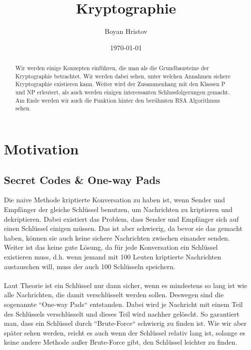 \documentclass[12pt,a4paper]{article}
\author{Boyan Hristov}
\title{Kryptographie}
\date{\today}
\theoremstyle{definition}
\begin{document}
    \maketitle
    \begin{abstract}
        Wir werden einige Konzepten einführen, die man als die Grundbausteine der Kryptographie betrachtet. Wir werden
        dabei sehen, unter welchen Annahmen sichere Kryptographie existieren kann. Weiter wird der Zusammenhang mit den
        Klassen P und NP erleutert, als auch werden einigen interessanten Schlussfolgerungen gemacht. Am Ende werden
        wir auch die Funktion hinter den berühmten RSA Algorithmus sehen.
    \end{abstract}
    \section{Motivation}

    \subsection{Secret Codes \& One-way Pads}
    Die naive Methode kriptierte Konversation zu haben ist, wenn Sender und Empfänger der gleiche Schlüssel benutzen,
    um Nachrichten zu kriptieren und dekriptieren. Dabei existiert das Problem, dass Sender und Empfänger sich auf
    einen Schlüssel einigen müssen. Das ist aber schwierig, da bevor sie das gemacht haben, können sie auch keine
    sichere Nachrichten zwischen einander senden. Weiter ist das keine gute Lösung, da für jede Konversation ein
    Schlüssel existieren muss, d.h. wenn jemand mit 100 Leuten kriptierte Nachrichten austauschen will, muss der auch
    100 Schlüsseln speichern. \\ \\

    Laut Theorie ist ein Schlüssel nur dann sicher, wenn es mindestens so lang ist wie alle Nachrichten, die damit
    verschlüsselt werden sollen. Deswegen sind die sogenannte ``One-way Pads`` entstanden. Dabei wird je Nachricht mit
    einem Teil des Schlüssels verschlüsselt und dieses Teil wird nachher gelöscht. So garantiert man, dass ein
    Schlüssel durch ``Brute-Force`` schwierig zu finden ist. Wie wir aber später sehen werden, reicht es auch wenn der
    Schlüssel relativ lang ist, solange es keine andere Methode außer Brute-Force gibt, den Schlüssel leichter zu
    finden. \\ \\
\end{document}
